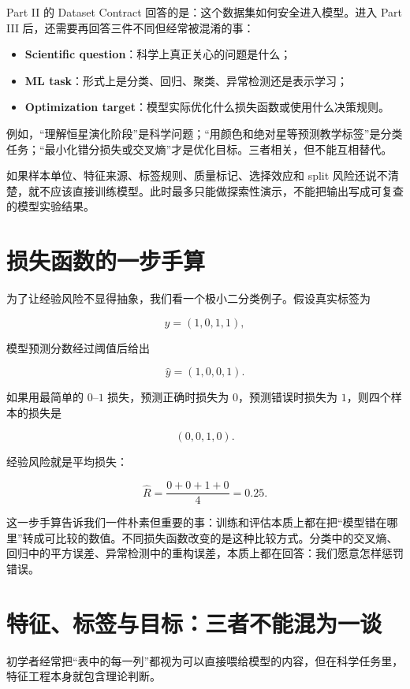 Part II 的 Dataset Contract 回答的是：这个数据集如何安全进入模型。进入 Part III 后，还需要再回答三件不同但经常被混淆的事：

\begin{itemize}
    \item \textbf{Scientific question}：科学上真正关心的问题是什么；
    \item \textbf{ML task}：形式上是分类、回归、聚类、异常检测还是表示学习；
    \item \textbf{Optimization target}：模型实际优化什么损失函数或使用什么决策规则。
\end{itemize}

例如，“理解恒星演化阶段”是科学问题；“用颜色和绝对星等预测教学标签”是分类任务；“最小化错分损失或交叉熵”才是优化目标。三者相关，但不能互相替代。

\begin{warnbox}
如果样本单位、特征来源、标签规则、质量标记、选择效应和 split 风险还说不清楚，就不应该直接训练模型。此时最多只能做探索性演示，不能把输出写成可复查的模型实验结果。
\end{warnbox}

\section{损失函数的一步手算}

为了让经验风险不显得抽象，我们看一个极小二分类例子。假设真实标签为

\[
y = (1,0,1,1),
\]

模型预测分数经过阈值后给出

\[
\hat{y} = (1,0,0,1).
\]

如果用最简单的 $0$--$1$ 损失，预测正确时损失为 $0$，预测错误时损失为 $1$，则四个样本的损失是

\[
(0,0,1,0).
\]

经验风险就是平均损失：

\[
\hat{R} = \frac{0+0+1+0}{4}=0.25.
\]

这一步手算告诉我们一件朴素但重要的事：训练和评估本质上都在把“模型错在哪里”转成可比较的数值。不同损失函数改变的是这种比较方式。分类中的交叉熵、回归中的平方误差、异常检测中的重构误差，本质上都在回答：我们愿意怎样惩罚错误。

\section{特征、标签与目标：三者不能混为一谈}

初学者经常把“表中的每一列”都视为可以直接喂给模型的内容，但在科学任务里，特征工程本身就包含理论判断。

